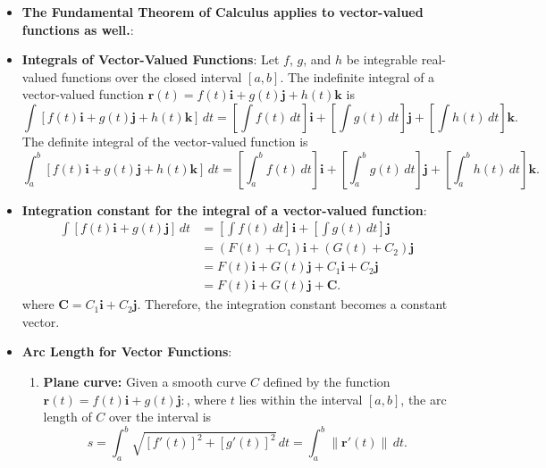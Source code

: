 \documentclass{report}
\begin{document}
\begin{itemize}
        \item \textbf{The Fundamental Theorem of Calculus applies to vector-valued functions as well.}:
        \item \textbf{Integrals of Vector-Valued Functions}:
            Let $f$, $g$, and $h$ be integrable real-valued functions over the closed interval $[a,b]$.
            The indefinite integral of a vector-valued function $\mathbf{r}(t) = f(t)\mathbf{i} + g(t)\mathbf{j} + h(t)\mathbf{k}$ is
            \begin{equation}
                \int [f(t)\mathbf{i} + g(t)\mathbf{j} + h(t)\mathbf{k}] \, dt = \left[ \int f(t) \, dt \right]\mathbf{i} + \left[ \int g(t) \, dt \right]\mathbf{j} + \left[ \int h(t) \, dt \right]\mathbf{k}.
            \end{equation}
            The definite integral of the vector-valued function is
            \begin{equation}
                \int_a^b [f(t)\mathbf{i} + g(t)\mathbf{j} + h(t)\mathbf{k}] \, dt = \left[ \int_a^b f(t) \, dt \right]\mathbf{i} + \left[ \int_a^b g(t) \, dt \right]\mathbf{j} + \left[ \int_a^b h(t) \, dt \right]\mathbf{k}.
            \end{equation}
        \item \textbf{Integration constant for the integral of a vector-valued function}:
            \begin{align*}
                \int [f(t)\mathbf{i} + g(t)\mathbf{j}] \, dt &= \left[ \int f(t) \, dt \right]\mathbf{i} + \left[ \int g(t) \, dt \right]\mathbf{j} \\
                &= (F(t) + C_1)\mathbf{i} + (G(t) + C_2)\mathbf{j} \\
                &= F(t)\mathbf{i} + G(t)\mathbf{j} + C_1\mathbf{i} + C_2\mathbf{j} \\
                &= F(t)\mathbf{i} + G(t)\mathbf{j} + \mathbf{C}
            .\end{align*}
            where $\mathbf{C} = C_1\mathbf{i} + C_2\mathbf{j}$. Therefore, the integration constant becomes a constant vector.
            \pagebreak 
        \item \textbf{Arc Length for Vector Functions}:
            \begin{enumerate}
                \item \textbf{Plane curve:} Given a smooth curve $C$ defined by the function $\mathbf{r}(t) = f(t)\mathbf{i} + g(t)\mathbf{j}:$, where $t$ lies within the interval $[a,b]$, the arc length of $C$ over the interval is
                    \begin{equation}
                        s = \int_{a}^{b} \sqrt{[f'(t)]^2 + [g'(t)]^2} \, dt = \int_{a}^{b} \|\mathbf{r}'(t)\| \, dt.
                    \end{equation}


\end{enumerate}
\end{itemize}
\end{document}
